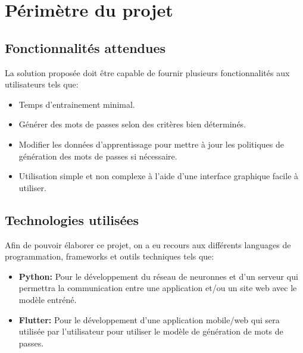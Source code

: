 \section{Périmètre du projet}
\subsection{Fonctionnalités attendues}
La solution proposée doit être capable de fournir plusieurs fonctionnalités aux utilisateurs tels que:
\begin{itemize}
    \item Temps d'entrainement minimal.
    \item Générer des mots de passes selon des critères bien déterminés.
    \item Modifier les données d'apprentissage pour mettre à jour les politiques de génération des mots de passes si nécessaire.
    \item Utilisation simple et non complexe à l'aide d'une interface graphique facile à utiliser.
\end{itemize}
\subsection{Technologies utilisées}
Afin de pouvoir élaborer ce projet, on a eu recours aux différents languages de programmation, frameworks et outils techniques tels que:
\begin{itemize}
    \item \textbf{Python:} Pour le développement du réseau de neuronnes et d'un serveur qui permettra la communication entre une application et/ou un site web avec le modèle entréné.
    \item \textbf{Flutter:} Pour le développement d'une application mobile/web qui sera utilisée par l'utilisateur pour utiliser le modèle de génération de mots de passes.
\end{itemize}